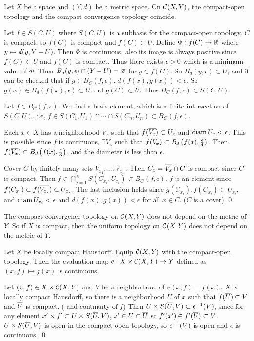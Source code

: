  Let \(X\) be a space and \((Y, d)\) be a metric space. On \(\mathcal{C}(X, Y)\), the compact-open topology and the compact convergence topology coincide.

\pf \note{\(\subset\)} Let \(f \in S(C, U)\) where \(S(C, U)\) is a subbasis for the compact-open topology. \(C\) is compact, so \(f(C)\) is compact and \(f(C) \subset U\). Define \(\Phi : f(C) \rightarrow \mathbb{R}\) where \(y \mapsto d(y, Y - U)\). Then \(\Phi\) is continuous, also its image is always positive since \(f(C) \subset U\) and \(f(C)\) is compact. Thus there exists \(\epsilon > 0\) which is a minimum value of \(\Phi\). Then \(B_d(y, \epsilon) \cap (Y - U) = \varnothing\) for \(y \in f(C)\). So \(B_d(y, \epsilon) \subset U\), and it can be checked that if \(g \in B_C(f, \epsilon)\), \(d(f(x), g(x)) < \epsilon\). So \(g(x) \in B_d(f(x), \epsilon) \subset U\) and \(g(C) \subset U\). Thus \(B_C(f, \epsilon) \subset S(C, U)\).

\note{\(\supset\)} Let \(f \in B_C(f, \epsilon)\). We find a basis element, which is a finite intersection of \(S(C, U)\). i.e, \(f \in S(C_1, U_1) \cap \cdots \cap S(C_n, U_n) \subset B_C(f, \epsilon)\).

Each \(x \in X\) has a neighborhood \(V_x\) such that \(f(\overline{V_x}) \subset U_x\) and \(\operatorname{diam} U_x < \epsilon\). This is possible since \(f\) is continuous, \(\exists V_x\) such that \(f(V_x) \subset B_d\left( f(x), \frac{\epsilon}{4} \right)\). Then \(f(\overline{V_x}) \subset B_d\left( f(x), \frac{\epsilon}{3} \right)\), and the diameter is less than \(\epsilon\).

Cover \(C\) by finitely many sets \(V_{x_1}, \dots, V_{x_n}\). Then \(C_x = \overline{V_x} \cap C\) is compact since \(C\) is compact. Then \(f \in \bigcap_{i=1}^n S(C_{x_i}, U_{x_i}) \subset B_C(f, \epsilon)\). \(f\) is an element since \(f(C_{x_i}) \subset f(\overline{V_{x_i}}) \subset U_{x_i}\). The last inclusion holds since \(g(C_{x_i}), f(C_{x_i}) \subset U_{x_i}\), and \(\operatorname{diam} U_{x_i} < \epsilon\) and \(d(f(x), g(x)) < \epsilon\) for all \(x \in C\). (\(C\) is a cover) \qed

 The compact convergence topology on \(\mathcal{C}(X, Y)\) does not depend on the metric of \(Y\). So if \(X\) is compact, then the uniform topology on \(\mathcal{C}(X, Y)\) does not depend on the metric of \(Y\).

 Let \(X\) be locally compact Hausdorff. Equip \(\mathcal{C}(X, Y)\) with the compact-open topology. Then the evaluation map \(e : X \times \mathcal{C}(X, Y) \rightarrow Y\) defined as \((x, f) \mapsto f(x)\) is continuous.

\pf Let \((x, f) \in X \times \mathcal{C}(X, Y)\) and \(V\) be a neighborhood of \(e(x, f) = f(x)\). \(X\) is locally compact Hausdorff, so there is a neighborhood \(U\) of \(x\) such that \(f(\overline{U}) \subset V\) and \(\overline{U}\) is compact. ( and continuity of \(f\)) Then \(U \times S(\overline{U}, V) \subset e^{-1}(V)\), since for any element \(x' \times f' \subset U \times S(\overline{U}, V)\), \(x' \in  U \subset \overline{U}\) so \(f'(x') \in f'(\overline{U}) \subset V\). \(U \times S(\overline{U}, V)\) is open in the compact-open topology, so \(e^{-1}(V)\) is open and \(e\) is continuous. \qed

\pagebreak

